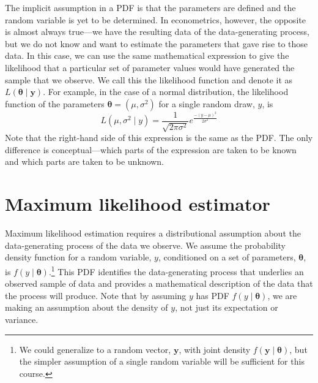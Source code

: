 \documentclass[11pt,letterpaper]{article}
\begin{document}
\noindent The implicit assumption in a PDF is that the parameters are defined and the random variable is yet to be determined. In econometrics, however, the opposite is almost always true---we have the resulting data of the data-generating process, but we do not know and want to estimate the parameters that gave rise to those data. In this case, we can use the same mathematical expression to give the likelihood that a particular set of parameter values would have generated the sample that we observe. We call this the likelihood function and denote it as $L(\bm{\theta} \mid \bm{y})$. For example, in the case of a normal distribution, the likelihood function of the parameters $\bm{\theta} = \left( \mu, \sigma^2 \right)$ for a single random draw, $y$, is
$$L(\mu, \sigma^2 \mid y) = \frac{1}{\sqrt{2 \pi \sigma^2}} e^{\frac{-(y - \mu)^2}{2 \sigma^2}}$$
Note that the right-hand side of this expression is the same as the PDF. The only difference is conceptual---which parts of the expression are taken to be known and which parts are taken to be unknown.

\section{Maximum likelihood estimator}

Maximum likelihood estimation requires a distributional assumption about the data-generating process of the data we observe. We assume the probability density function for a random variable, $y$, conditioned on a set of parameters, $\bm{\theta}$, is $f(y \mid \bm{\theta})$.\footnote{We could generalize to a random vector, $\bm{y}$, with joint density $f(\bm{y} \mid \bm{\theta})$, but the simpler assumption of a single random variable will be sufficient for this course.} This PDF identifies the data-generating process that underlies an observed sample of data and provides a mathematical description of the data that the process will produce. Note that by assuming $y$ has PDF $f(y \mid \bm{\theta})$, we are making an assumption about the density of $y$, not just its expectation or variance. \\
\end{document}
